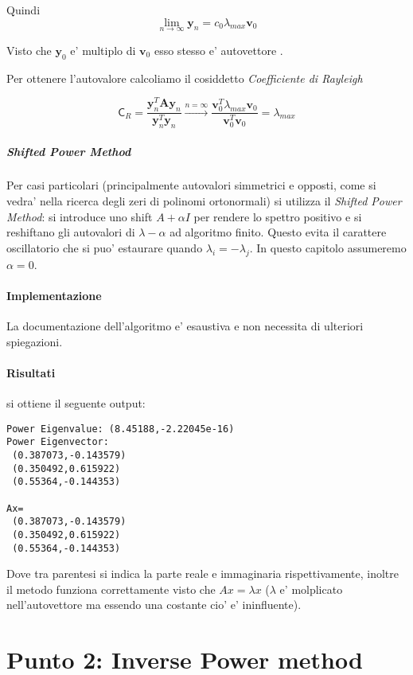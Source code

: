 Quindi \[ \lim_{n \rightarrow \infty} \mathbf{y}_n = c_0 \lambda_{max} \mathbf{v}_0 \]

Visto che $\mathbf{y}_0$ e' multiplo di $\mathbf{v}_0$ esso stesso e' autovettore .

Per ottenere l'autovalore calcoliamo il cosiddetto \textit{Coefficiente di Rayleigh}

\[ \mathsf{C}_R = \frac{\mathbf{y}_n^T \mathbf{A} \mathbf{y}_n}{\mathbf{y}_n^T \mathbf{y}_n} \xrightarrow{n = \infty} \frac{\mathbf{v}_0^T \lambda_{max} \mathbf{v}_0}{\mathbf{v}_0^T \mathbf{v}_0} = \lambda_{max} \]

\subparagraph{Shifted Power Method}

Per casi particolari (principalmente autovalori simmetrici e opposti, come si vedra' nella ricerca degli zeri di polinomi ortonormali) si utilizza il \textit{Shifted Power Method}: si introduce uno shift $A + \alpha I$ per rendere lo spettro positivo e si reshiftano gli autovalori di $\lambda-\alpha$ ad algoritmo finito. Questo evita il carattere oscillatorio che si puo' estaurare quando $\lambda_i = -\lambda_j$.
In questo capitolo assumeremo $\alpha = 0$.

\paragraph{Implementazione}

La documentazione dell'algoritmo e' esaustiva e non necessita di ulteriori spiegazioni.

\paragraph{Risultati} si ottiene il seguente output:

\begin{lstlisting}
Power Eigenvalue: (8.45188,-2.22045e-16)
Power Eigenvector: 
 (0.387073,-0.143579)
 (0.350492,0.615922)
 (0.55364,-0.144353)

Ax= 
 (0.387073,-0.143579)
 (0.350492,0.615922)
 (0.55364,-0.144353)
\end{lstlisting}

Dove tra parentesi si indica la parte reale e immaginaria rispettivamente, inoltre il metodo funziona correttamente visto che $Ax = \lambda x$ ($\lambda$ e' molplicato nell'autovettore ma essendo una costante cio' e' ininfluente).

\section{Punto 2: Inverse Power method}

